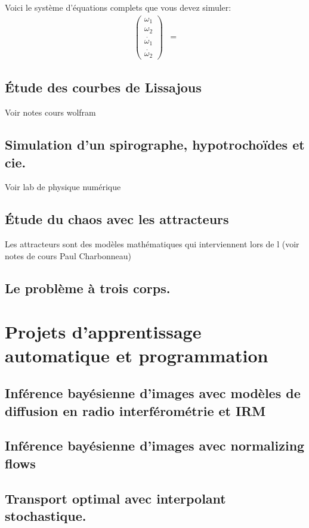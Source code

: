 \documentclass[titlepage]{article}
\theoremstyle{cleanremark}
\begin{document}
Voici le système d'équations complets que vous devez simuler:
\begin{align}
    \begin{pmatrix}
        \omega_1 \\
        \omega_2 \\
        \dot{\omega_1} \\
        \dot{\omega_2}
    \end{pmatrix}
    &=
\end{align}

\subsection{Étude des courbes de Lissajous}
Voir notes cours wolfram

\subsection{Simulation d'un spirographe, hypotrochoïdes et cie.}
Voir lab de physique numérique

\subsection{Étude du chaos avec les attracteurs}
Les attracteurs sont des modèles mathématiques qui interviennent lors de l
(voir notes de cours Paul Charbonneau)

\subsection{Le problème à trois corps.}

\section{Projets d'apprentissage automatique et programmation}
\subsection{Inférence bayésienne d'images avec modèles de diffusion en radio interférométrie et IRM}


\subsection{Inférence bayésienne d'images avec normalizing flows}


\subsection{Transport optimal avec interpolant stochastique.}
\end{document}
